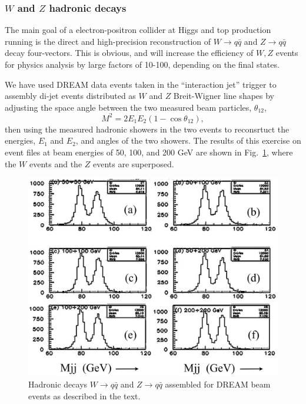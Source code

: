 \subsubsection{$W$ and $Z$ hadronic decays}

The main goal of a electron-positron collider at  Higgs and top production running is the direct and high-precision reconstruction of  $W \rightarrow q\bar{q}$ and  $Z \rightarrow q\bar{q}$ decay four-vectors.   This is obvious, and will increase the efficiency of $W,Z$ events for physics analysis by large factors of 10-100, depending on the final states.

We have used DREAM data events taken in the ``interaction jet'' trigger to assembly di-jet events distributed as $W$ and $Z$ Breit-Wigner line shapes by adjusting the space angle between the two measured beam particles, $\theta_{12}$, 
\begin{displaymath}
   M^2 = 2 E_1 E_2 ( 1 - \cos \theta_{12}),
\end{displaymath}
then using the measured hadronic showers in the two events to reconsrtuct the energies, $E_1$ and $E_2$, and angles of the two showers.  The results of this exercise on event files at beam energies of 50, 100, and 200 GeV are shown in 
Fig.~\ref{fig:wz}, where the $W$ events and the $Z$ events are superposed.

\begin{figure}
 \centering
 \includegraphics[scale=0.45]{Calorimeter/DualReadout/WZ-Dream-data-all.jpg}
  \caption{Hadronic decays $W \rightarrow q\bar{q}$ and  $Z \rightarrow q\bar{q}$ assembled for DREAM beam events as described in the text.}
  \label{fig:wz}
\end{figure}


